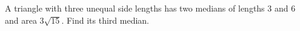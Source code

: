 A triangle with three unequal side lengths has two medians of lengths $ 3 $ and $ 6 $ and area $ 3\sqrt{15}$. Find its third median.
